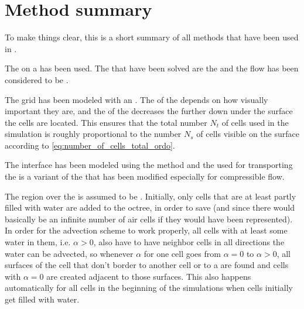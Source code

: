\chapter{Method summary}

To make things clear, this is a short summary of all methods that have been used in \thisprojectwork.

The \FVM on a  has been used. The \PDEs that have been solved are the  and the flow has been considered to be .

The grid has been modeled with an \octree. The \LOD of the  depends on how visually important they are, and the \LOD of the  decreases the further down under the surface the cells are located. This ensures that the total number $N_t$ of cells used in the simulation is roughly proportional to the number $N_s$ of cells visible on the surface according to \eqref{eq:number_of_cells_total_ordo}.

The interface has been modeled using the \VOF method and the  used for transporting the  is a variant of the  that has been modified especially for compressible flow.

The region over the  is assumed to be \air. Initially, only cells that are at least partly filled with water are added to the octree, in order to save  (and since there would basically be an infinite number of air cells if they would have been represented). In order for the advection scheme to work properly, all cells with at least some water in them, i.e. $\alpha > 0$, also have to have neighbor cells in all directions the water can be advected, so whenever $\alpha$ for one cell goes from $\alpha = 0$ to $\alpha > 0$, all surfaces of the cell that don't border to another cell or to a  are found and cells with $\alpha = 0$ are created adjacent to those surfaces. This also happens automatically for all cells in the beginning of the simulations when cells initially get filled with water.
